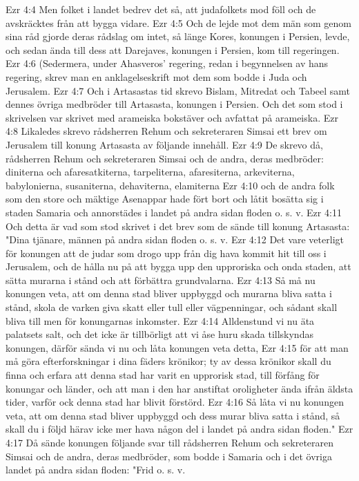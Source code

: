 Ezr 4:4  Men folket i landet bedrev det så, att judafolkets mod föll och de avskräcktes från att bygga vidare.
Ezr 4:5  Och de lejde mot dem män som genom sina råd gjorde deras rådslag om intet, så länge Kores, konungen i Persien, levde, och sedan ända till dess att Darejaves, konungen i Persien, kom till regeringen.
Ezr 4:6  (Sedermera, under Ahasveros' regering, redan i begynnelsen av hans regering, skrev man en anklagelseskrift mot dem som bodde i Juda och Jerusalem.
Ezr 4:7  Och i Artasastas tid skrevo Bislam, Mitredat och Tabeel samt dennes övriga medbröder till Artasasta, konungen i Persien. Och det som stod i skrivelsen var skrivet med arameiska bokstäver och avfattat på arameiska.
Ezr 4:8  Likaledes skrevo rådsherren Rehum och sekreteraren Simsai ett brev om Jerusalem till konung Artasasta av följande innehåll.
Ezr 4:9  De skrevo då, rådsherren Rehum och sekreteraren Simsai och de andra, deras medbröder: diniterna och afaresatkiterna, tarpeliterna, afaresiterna, arkeviterna, babylonierna, susaniterna, dehaviterna, elamiterna
Ezr 4:10  och de andra folk som den store och mäktige Asenappar hade fört bort och låtit bosätta sig i staden Samaria och annorstädes i landet på andra sidan floden o. s. v.
Ezr 4:11  Och detta är vad som stod skrivet i det brev som de sände till konung Artasasta: "Dina tjänare, männen på andra sidan floden o. s. v.
Ezr 4:12  Det vare veterligt för konungen att de judar som drogo upp från dig hava kommit hit till oss i Jerusalem, och de hålla nu på att bygga upp den upproriska och onda staden, att sätta murarna i stånd och att förbättra grundvalarna.
Ezr 4:13  Så må nu konungen veta, att om denna stad bliver uppbyggd och murarna bliva satta i stånd, skola de varken giva skatt eller tull eller vägpenningar, och sådant skall bliva till men för konungarnas inkomster.
Ezr 4:14  Alldenstund vi nu äta palatsets salt, och det icke är tillbörligt att vi åse huru skada tillskyndas konungen, därför sända vi nu och låta konungen veta detta,
Ezr 4:15  för att man må göra efterforskningar i dina fäders krönikor; ty av dessa krönikor skall du finna och erfara att denna stad har varit en upprorisk stad, till förfång för konungar och länder, och att man i den har anstiftat oroligheter ända ifrån äldsta tider, varför ock denna stad har blivit förstörd.
Ezr 4:16  Så låta vi nu konungen veta, att om denna stad bliver uppbyggd och dess murar bliva satta i stånd, så skall du i följd härav icke mer hava någon del i landet på andra sidan floden."
Ezr 4:17  Då sände konungen följande svar till rådsherren Rehum och sekreteraren Simsai och de andra, deras medbröder, som bodde i Samaria och i det övriga landet på andra sidan floden: "Frid o. s. v.
